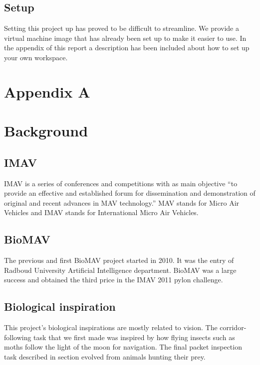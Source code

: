 \documentclass[a4paper,10pt]{article}
\begin{document}
\subsection{Setup}
Setting this project up has proved to be difficult to streamline. We provide
a virtual machine image that has already been set up to make it easier to use.
In the appendix of this report a description has been included about how to set up your own workspace. 



\newpage
\section*{Appendix A}
\section{Background}
\label{sec:background}
\subsection{IMAV}
IMAV is a series of conferences and competitions with as main objective
``to provide an effective and established forum for dissemination and
demonstration of original and recent advances in MAV technology.''\cite{imav}
MAV stands for Micro Air Vehicles and IMAV stands for International
Micro Air Vehicles.

\subsection{BioMAV}
The previous and first BioMAV project started in 2010. It was the entry
of Radboud University Artificial Intelligence department. BioMAV was a large
success and obtained the third price in the IMAV 2011 pylon challenge.

\subsection{Biological inspiration}
This project's biological inspirations are mostly related to vision. The
corridor-following task that we first made was inspired by how flying insects such as moths
follow the light of the moon for navigation. The final packet inspection task described in section 
evolved from animals hunting their prey.
\end{document}
